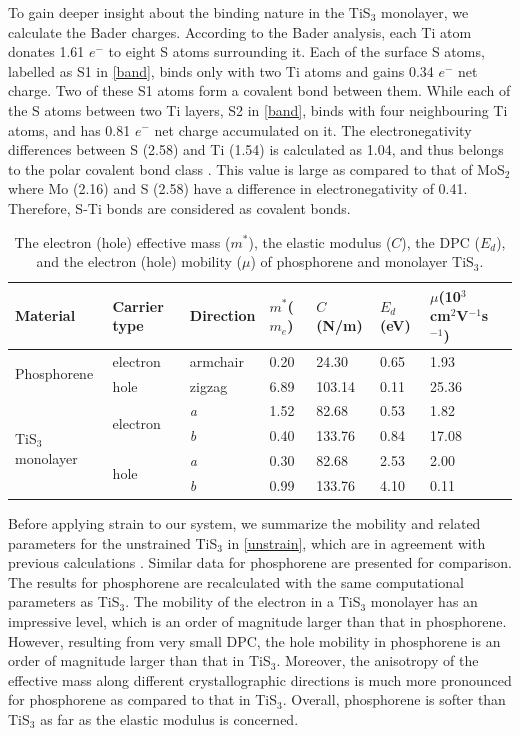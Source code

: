 To gain deeper insight about the binding nature in the TiS$_3$ monolayer, we calculate the Bader charges\cite{Bader1,Bader2,Bader3,Bader4}. According to the Bader analysis, each Ti atom donates 1.61 $e^-$ to eight S atoms surrounding it. Each of the surface S atoms, labelled as S1 in \autoref{band}, binds only with two Ti atoms and gains 0.34 $e^-$ net charge. Two of these S1 atoms form a covalent bond between them. While each of the S atoms between two Ti layers, S2 in \autoref{band}, binds with four neighbouring Ti atoms, and has 0.81 $e^-$ net charge accumulated on it.  The electronegativity differences between S (2.58) and Ti (1.54) is calculated as 1.04, and thus belongs to the polar covalent bond class \cite{David2015}.  This value is large as compared to that of MoS$_2$ where Mo (2.16) and S (2.58) have a difference in electronegativity of 0.41. Therefore, S-Ti bonds are considered as covalent bonds.

\begin{table}[ht]
\caption{The electron (hole) effective mass ($m^*$), the elastic modulus ($C$), the DPC ($E_d$), and the electron (hole) mobility ($\mu$) of phosphorene and monolayer TiS$_3$.}
\centering
\begin{footnotesize}
\begin{tabularx}{\textwidth}{l|lXXXXXX}
\hline\hline
Material & Carrier type & Direction & $m^*$($m_e$) & $C$(N/m) & $E_d$(eV) &  $\mu$(10$^3$ cm$^2$V$^{-1}$s$^{-1}$)\\ \hline
\multirow{2}{*}{Phosphorene} & electron & armchair & 0.20 & 24.30 & 0.65 &  1.93 \\
& hole & zigzag & 6.89 & 103.14 & 0.11 & 25.36 \\ \hline
\multirow{4}{*}{TiS$_3$ monolayer} & \multirow{2}{*}{electron} & \textit{a} & 1.52 & 82.68 & 0.53 & 1.82 \\
&   & \textit{b} & 0.40 & 133.76 & 0.84 & 17.08 \\ 
& \multirow{2}{*}{hole} & \textit{a} & 0.30 & 82.68 & 2.53 & 2.00 \\ 
&   & \textit{b} & 0.99 & 133.76 & 4.10 & 0.11 \\ \hline\hline

\end{tabularx}
\label{unstrain}
\end{footnotesize}
\end{table}

Before  applying strain to our system, we summarize  the mobility and related parameters for the unstrained TiS$_3$ in \autoref{unstrain}, which are in agreement with previous calculations \cite{Dai2015}. Similar data for phosphorene are presented for comparison. The results for phosphorene are recalculated with the same computational parameters as TiS$_3$. The mobility of the electron in a TiS$_3$ monolayer has an impressive level, which is an order of magnitude larger than that in phosphorene. However, resulting from very small DPC, the hole mobility in phosphorene is an order of magnitude larger than that in TiS$_3$.  Moreover, the anisotropy of the effective mass along different crystallographic directions is much more pronounced for phosphorene as compared to that in TiS$_3$. Overall, phosphorene is softer than TiS$_3$ as far as the elastic modulus is concerned.

